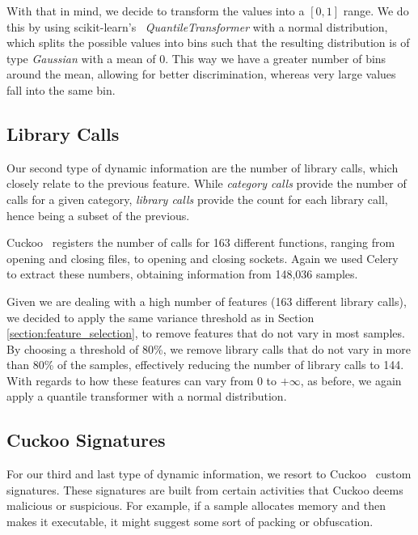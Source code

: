 With that in mind, we decide to transform the values into a $[0,1]$ range.
We do this by using scikit-learn's~\cite{tool:sklearn} \textit{QuantileTransformer} with a normal distribution, which splits the possible values into bins such that the resulting distribution is of type \textit{Gaussian} with a mean of 0.
This way we have a greater number of bins around the mean, allowing for better discrimination, whereas very large values fall into the same bin.

\subsection{Library Calls}
\label{section:improvements_api_unigrams}

Our second type of dynamic information are the number of library calls, which closely relate to the previous feature.
While \textit{category calls} provide the number of calls for a given category, \textit{library calls} provide the count for each library call, hence being a subset of the previous.

Cuckoo~\cite{tool:cuckoo} registers the number of calls for 163 different functions, ranging from opening and closing files, to opening and closing sockets.
Again we used Celery~\cite{tool:celery} to extract these numbers, obtaining information from 148,036 samples.

Given we are dealing with a high number of features (163 different library calls), we decided to apply the same variance threshold as in Section \ref{section:feature_selection}, to remove features that do not vary in most samples.
By choosing a threshold of 80\%, we remove library calls that do not vary in more than 80\% of the samples, effectively reducing the number of library calls to 144.
With regards to how these features can vary from 0 to $+\infty$, as before, we again apply a quantile transformer with a normal distribution.

\subsection{Cuckoo Signatures}
\label{section:improvements_categories}

For our third and last type of dynamic information, we resort to Cuckoo~\cite{tool:cuckoo} custom signatures.
These signatures are built from certain activities that Cuckoo deems malicious or suspicious.
For example, if a sample allocates memory and then makes it executable, it might suggest some sort of packing or obfuscation.

